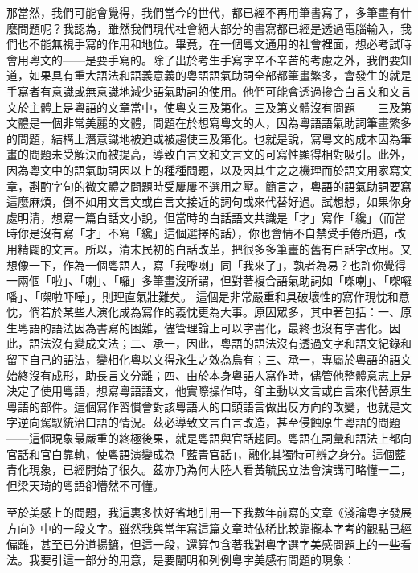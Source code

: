 \documentclass[a5paper, 10pt, openany]{book} %
\begin{document}
那當然，我們可能會覺得，我們當今的世代，都已經不再用筆書寫了，多筆畫有什麼問題呢？我認為，雖然我們現代社會絕大部分的書寫都已經是透過電腦輸入，我們也不能無視手寫的作用和地位。畢竟，在一個粵文通用的社會裡面，想必考試時會用粵文的——是要手寫的。除了出於考生手寫字辛不辛苦的考慮之外，我們要知道，如果具有重大語法和語義意義的粵語語氣助詞全部都筆畫繁多，會發生的就是手寫者有意識或無意識地減少語氣助詞的使用。他們可能會透過摻合白言文和文言文於主體上是粵語的文章當中，使粵文三及第化。三及第文體沒有問題——三及第文體是一個非常美麗的文體，問題在於想寫粵文的人，因為粵語語氣助詞筆畫繁多的問題，結構上潛意識地被迫或被趨使三及第化。也就是說，寫粵文的成本因為筆畫的問題未受解決而被提高，導致白言文和文言文的可寫性顯得相對吸引。此外，因為粵文中的語氣助詞因以上的種種問題，以及因其生之之機理而於語文用家寫文章，斟酌字句的微文體之問題時受屢屢不選用之壓。簡言之，粵語的語氣助詞要寫這麼麻煩，倒不如用文言文或白言文接近的詞句或來代替好過。試想想，如果你身處明清，想寫一篇白話文小說，但當時的白話語文共識是「才」寫作「纔」（而當時你是沒有寫「才」不寫「纔」這個選擇的話），你也會情不自禁受手倦所逼，改用精闢的文言。所以，清末民初的白話改革，把很多多筆畫的舊有白話字改用。又想像一下，作為一個粵語人，寫「我嚟喇」同「我來了」，孰者為易？也許你覺得一兩個「啦」、「喇」、「囉」多筆畫沒所謂，但對著複合語氣助詞如「㗎喇」、「㗎囉噃」、「㗎啦吓嘩」，則理直氣壯難矣。
這個是非常嚴重和具破壞性的寫作現忱和意忱，倘若於某些人演化成為寫作的義忱更為大事。原因眾多，其中著包括：一、原生粵語的語法因為書寫的困難，儘管理論上可以字書化，最終也沒有字書化。因此，語法沒有變成文法；二、承一，因此，粵語的語法沒有透過文字和語文紀錄和留下自己的語法，變相化粵以文得永生之效為烏有；三、承一，專屬於粵語的語文始終沒有成形，助長言文分離；四、由於本身粵語人寫作時，儘管他整體意志上是決定了使用粵語，想寫粵語語文，他實際操作時，卻主動以文言或白言來代替原生粵語的部件。這個寫作習慣會對該粵語人的口頭語言做出反方向的改變，也就是文字逆向駕馭統治口語的情況。茲必導致文言白言改造，甚至侵蝕原生粵語的問題——這個現象最嚴重的終極後果，就是粵語與官話趨同。粵語在詞彙和語法上都向官話和官白靠軌，使粵語演變成為「藍青官話」，融化其獨特可辨之身分。這個藍青化現象，已經開始了很久。茲亦乃為何大陸人看黃毓民立法會演講可略懂一二，但梁天琦的粵語卻懵然不可懂。

至於美感上的問題，我這裏多快好省地引用一下我數年前寫的文章《淺論粵字發展方向》中的一段文字。雖然我與當年寫這篇文章時依稀比較靠攏本字考的觀點已經偏離，甚至已分道揚鑣，但這一段，還算包含著我對粵字選字美感問題上的一些看法。我要引這一部分的用意，是要闡明和列例粵字美感有問題的現象：
\end{document}
